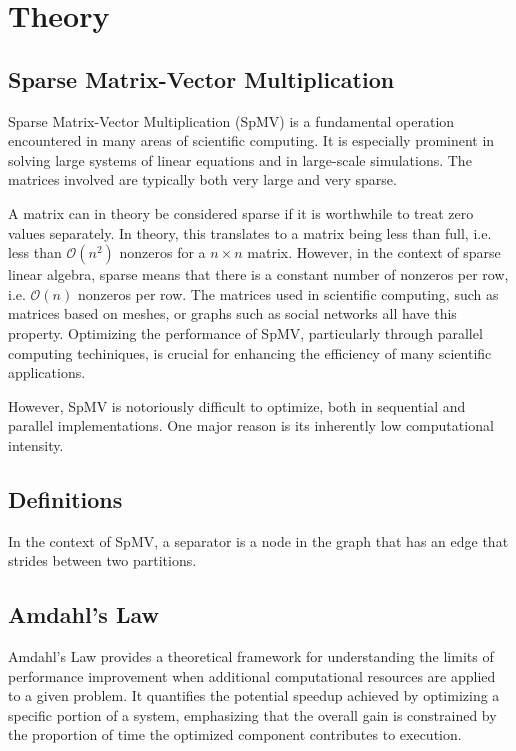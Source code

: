 
\chapter{Theory}

\section{Sparse Matrix-Vector Multiplication}
Sparse Matrix-Vector Multiplication (SpMV) is a fundamental operation encountered in many areas of scientific computing. It is especially prominent in solving large systems of linear equations and in large-scale simulations. The matrices involved are typically both very large and very sparse. 

A matrix can in theory be considered sparse if it is worthwhile to treat zero values separately. In theory, this translates to a matrix being less than full, i.e. less than \( \mathcal{O}\left(n^2\right)\) nonzeros for a \(n \times  n\) matrix. However, in the context of sparse linear algebra, sparse means that there is a constant number of nonzeros per row, i.e. \(\mathcal{O}\left(n\right)\) nonzeros per row. The matrices used in scientific computing, such as matrices based on meshes, or graphs such as social networks all have this property. Optimizing the performance of SpMV, particularly through parallel computing techiniques, is crucial for enhancing the efficiency of many scientific applications.

However, SpMV is notoriously difficult to optimize, both in sequential and parallel implementations. One major reason is its inherently low computational intensity.

\section{Definitions}

\begin{definition}[Separator]
    In the context of SpMV, a separator is a node in the graph that has an edge that strides between two partitions.
\end{definition}

\section{Amdahl's Law}

Amdahl’s Law provides a theoretical framework for understanding the limits of performance improvement when additional computational resources are applied to a given problem. It quantifies the potential speedup achieved by optimizing a specific portion of a system, emphasizing that the overall gain is constrained by the proportion of time the optimized component contributes to execution.

